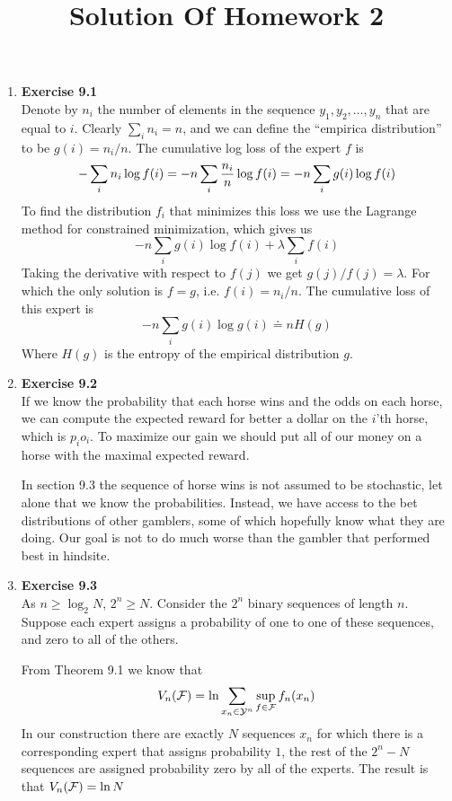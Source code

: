 \documentclass[12pt]{article}
\title{Solution Of Homework 2}
\begin{document}
\maketitle
\begin{enumerate}
\item {\bf Exercise 9.1} \\
Denote by $n_i$ the number of elements in the sequence $y_1,y_2,\ldots,y_n$
that are equal to $i$. Clearly $\sum_i n_i = n$, and we can define the
``empirica distribution'' to be $g(i) = n_i / n$.
The cumulative log loss of the expert $f$ is 
\[
-\sum_i n_i \log f(i) = -n \sum_i {n_i \over n} \log f(i) = -n \sum_i
g(i) \log f(i)
\]
To find the distribution $f_i$ that minimizes this loss we use the
Lagrange method for constrained minimization, which gives us
\[
-n \sum_i g(i) \log f(i) + \lambda \sum_i f(i)
\]
Taking the derivative with respect to $f(j)$ we get $g(j)/f(j) =
\lambda$. For which the only solution is $f=g$, i.e. $f(i)=n_i/n$.
The cumulative loss of this expert is 
\[
-n \sum_i g(i) \log g(i) \doteq nH(g)
\]
Where $H(g)$ is the entropy of the empirical distribution $g$.

\item {\bf Exercise 9.2} \\
If we know the probability that each horse wins and the odds on each
horse, we can compute the expected reward for better a dollar on the
$i$'th horse, which is $p_i o_i$. To maximize our gain we should put
all of our money on a horse with the maximal expected reward.

In section 9.3 the sequence of horse wins is not assumed to be
stochastic, let alone that we know the probabilities. Instead, we have
access to the bet distributions of other gamblers, some of which
hopefully know what they are doing. Our goal is not to do much worse
than the gambler that performed best in hindsite.

\item {\bf Exercise 9.3} \\
As $n \geq \log_2N$, $2^n \geq N$. Consider the $2^n$ binary sequences
of length $n$. Suppose each expert assigns a probability of one to one
of these sequences, and zero to all of the others.

From Theorem 9.1 we know that 
\[
V_n({\cal F}) = \ln \sum_{x_n \in {\cal Y}^n} \sup_{f \in {\cal F}} f_n(x_n)
\]
In our construction there are exactly $N$ sequences $x_n$ for which 
there is a corresponding expert that assigns probability $1$, the rest
of the $2^n - N$ sequences are assigned probability zero by all of the
experts. The result is that $V_n({\cal F}) = \ln N$


\end{enumerate}
\end{document}
